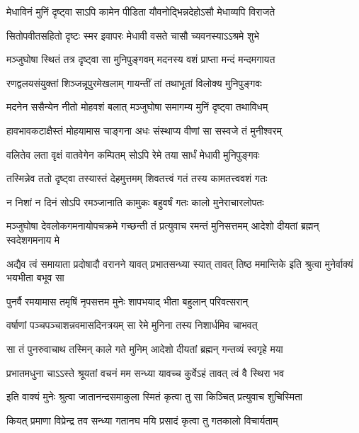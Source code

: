 \twolineshloka
{मेधाविनं मुनिं दृष्ट्वा साऽपि कामेन पीडिता}
{यौवनोद्भिन्नदेहोऽसौ मेधाव्यपि विराजते}%

\twolineshloka
{सितोपवीतसहितो दृष्टः स्मर इवापरः}
{मेधावी वसते चासौ च्यवनस्याऽऽश्रमे शुभे}%

\twolineshloka
{मञ्जुघोषा स्थितं तत्र दृष्ट्वा सा मुनिपुङ्गवम्}
{मदनस्य वशं प्राप्ता मन्दं मन्दमगायत}%

\twolineshloka
{रणद्वलयसंयुक्तां शिञ्जन्नूपुरमेखलाम्}
{गायन्तीं तां तथाभूतां विलोक्य मुनिपुङ्गवः}%

\twolineshloka
{मदनेन ससैन्येन नीतो मोहवशं बलात्}
{मञ्जुघोषा समागम्य मुनिं दृष्ट्वा तथाविधम्}%

\twolineshloka
{हावभावकटाक्षैस्तं मोहयामास चाङ्गना}
{अधः संस्थाप्य वीणां सा सस्वजे तं मुनीश्वरम्}%

\twolineshloka
{वलितेव लता वृक्षं वातवेगेन कम्पितम्}
{सोऽपि रेमे तया सार्धं मेधावी मुनिपुङ्गवः}%

\twolineshloka
{तस्मिन्नेव ततो दृष्ट्वा तस्यास्तं देहमुत्तमम्}
{शिवतत्त्वं गतं तस्य कामतत्त्ववशं गतः}%

\twolineshloka
{न निशां न दिनं सोऽपि रमञ्जानाति कामुकः}
{बहुवर्षं गतः कालो मुनेराचारलोपतः}%

\threelineshloka
{मञ्जुघोषा देवलोकगमनायोपचक्रमे}
{गच्छन्ती तं प्रत्युवाच रमन्तं मुनिसत्तमम्}
{आदेशो दीयतां ब्रह्मन् स्वदेशगमनाय मे}%


\threelineshloka
{अद्यैव त्वं समायाता प्रदोषादौ वरानने}
{यावत् प्रभातसन्ध्या स्यात् तावत् तिष्ठ ममान्तिके}
{इति श्रुत्वा मुनेर्वाक्यं भयभीता बभूव सा}%

\twolineshloka
{पुनर्वै रमयामास तमृषिं नृपसत्तम}
{मुनेः शापभयाद् भीता बहुलान् परिवत्सरान्}%

\twolineshloka
{वर्षाणां पञ्चपञ्चाशन्नवमासदिनत्रयम्}
{सा रेमे मुनिना तस्य निशार्धमिव चाभवत्}%

\twolineshloka
{सा तं पुनरुवाचाथ तस्मिन् काले गते मुनिम्}
{आदेशो दीयतां ब्रह्मन् गन्तव्यं स्वगृहे मया}%


\twolineshloka
{प्रभातमधुना चाऽऽस्ते श्रूयतां वचनं मम}
{सन्ध्या यावच्च कुर्वेऽहं तावत् त्वं वै स्थिरा भव}%

\twolineshloka
{इति वाक्यं मुनेः श्रुत्वा जातानन्दसमाकुला}
{स्मितं कृत्वा तु सा किञ्चित् प्रत्युवाच शुचिस्मिता}%


\twolineshloka
{कियत् प्रमाणा विप्रेन्द्र तव सन्ध्या गतानघ}
{मयि प्रसादं कृत्वा तु गतकालो विचार्यताम्}%

